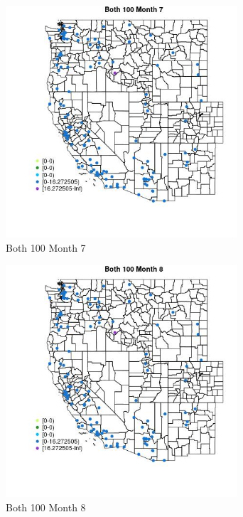 \begin{figure} 
\centering  
\includegraphics[width=0.77\textwidth]{Code_Outputs/Report_ML_input_PM25_Step4_part_e_de_duplicated_aves_MapObsMo7Both_100.jpg} 
\caption{\label{fig:Report_ML_input_PM25_Step4_part_e_de_duplicated_avesMapObsMo7Both_100}Both 100 Month 7} 
\end{figure} 
 

\begin{figure} 
\centering  
\includegraphics[width=0.77\textwidth]{Code_Outputs/Report_ML_input_PM25_Step4_part_e_de_duplicated_aves_MapObsMo8Both_100.jpg} 
\caption{\label{fig:Report_ML_input_PM25_Step4_part_e_de_duplicated_avesMapObsMo8Both_100}Both 100 Month 8} 
\end{figure} 
 

